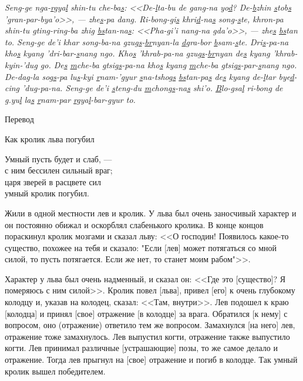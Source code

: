 \emph{Seng-ge nga-\ul{r}gya\ul{l} shin-tu che-ba\ul{s}: <<De-\ul{l}ta-bu de gang-na yo\ul{d}?
De-\ul{b}zhin \ul{s}tob\ul{s} 'gran-par-bya'o>>, --- zhe\ul{s}-pa dang.
Ri-bong-gi\ul{s} khri\ul{d}-na\ul{s} song-\ul{s}te,
khron-pa shin-tu \ul{g}ting-ring-ba zhig \ul{bs}tan-na\ul{s}: <<Pha-gi'i nang-na \ul{g}da'o>>, ---
zhe\ul{s} \ul{bs}tan to.
Seng-ge de'i khar song-ba-na gzug\ul{s}-\ul{br}nyan-la \ul{d}gra-bor \ul{b}sam-\ul{s}te.
Dri\ul{s}-pa-na kho\ul{s} kyang 'dri-bar-\ul{s}nang ngo.
Kho\ul{s} 'khrab-pa-na \ul{g}zug\ul{s}-\ul{br}nyan de\ul{s} kyang 'khrab-kyin-'dug go.
De\ul{s} \ul{m}che-ba \ul{g}tsig\ul{s}-pa-na kho\ul{s} kyang \ul{m}che-ba \ul{g}tsig\ul{s}-par-\ul{s}nang ngo.
De-dag-la sog\ul{s}-pa lu\ul{s}-kyi \ul{r}nam-'gyur \ul{s}na-tshog\ul{s} \ul{bs}tan-pa\ul{s} de\ul{s} kyang de-\ul{l}tar bye\ul{d}-cing 'dug-pa-na.
Seng-ge de'i \ul{s}teng-du \ul{m}chong\ul{s}-na\ul{s} shi'o.
\ul{B}lo-\ul{g}sa\ul{l} ri-bong de g.yu\ul{l} la\ul{s} \ul{r}nam-par \ul{r}gya\ul{l}-bar-gyur to.
}

\begin{center}Перевод\end{center}

Как кролик льва погубил

\epigraph{Умный пусть будет и слаб, ---\\
с ним бессилен сильный враг;\\
царя зверей в расцвете сил\\
умный кролик погубил.}{}

Жили в одной местности лев и кролик. У льва был очень заносчивый характер и он постоянно обижал и оскорблял слабенького кролика. В конце концов пораскинул кролик мозгами и сказал льву: <<О господин! Появилось какое-то существо, похожее на тебя и сказало: "Если [лев] может потягаться со мной силой, то пусть потягается. Если же нет, то станет моим рабом"{}>>.

Характер у льва был очень надменный, и сказал он: <<Где это [существо]? Я померяюсь с ним силой>>. Кролик повел [льва], привел [его] к очень глубокому колодцу и,
указав на колодец, сказал: <<Там, внутри>>. Лев подошел к краю [колодца] и принял [свое] отражение [в колодце] за врага. Обратился [к нему] с вопросом, оно (отражение) ответило тем же вопросом. Замахнулся [на него] лев, отражение тоже замахнулось. Лев выпустил когти, отражение также выпустило когти. Лев принимал различные [устрашающие] позы, то же самое делало и отражение. Тогда лев прыгнул на [свое] отражение и погиб в колодце. Так умный кролик вышел победителем.

